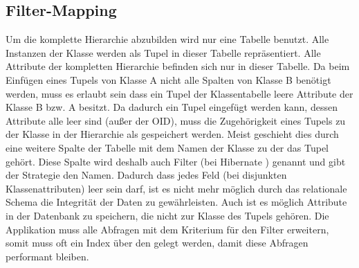 \subsection{Filter-Mapping}
Um die komplette Hierarchie abzubilden wird nur eine Tabelle benutzt. Alle Instanzen der Klasse werden als Tupel in dieser Tabelle repräsentiert. Alle Attribute der kompletten Hierarchie befinden sich nur in dieser Tabelle. Da beim Einfügen eines Tupels von Klasse A nicht alle Spalten von Klasse B benötigt werden, muss es erlaubt sein dass ein Tupel der Klassentabelle leere Attribute der Klasse B bzw. A besitzt. Da dadurch ein Tupel eingefügt werden kann, dessen Attribute alle leer sind (außer der OID), muss die Zugehörigkeit eines Tupels zu der Klasse in der Hierarchie als  gespeichert werden. Meist geschieht dies durch eine weitere Spalte der Tabelle mit dem Namen der Klasse zu der das Tupel gehört. Diese Spalte wird deshalb auch Filter (bei Hibernate ) genannt und gibt der Strategie den Namen. Dadurch dass jedes Feld (bei disjunkten Klassenattributen) leer sein darf, ist es nicht mehr möglich durch das relationale Schema die Integrität der Daten zu gewährleisten. Auch ist es möglich Attribute in der Datenbank zu speichern, die nicht zur Klasse des Tupels gehören. Die Applikation muss alle Abfragen mit dem Kriterium für den Filter erweitern, somit muss oft ein Index über den  gelegt werden, damit diese Abfragen performant bleiben.\\

